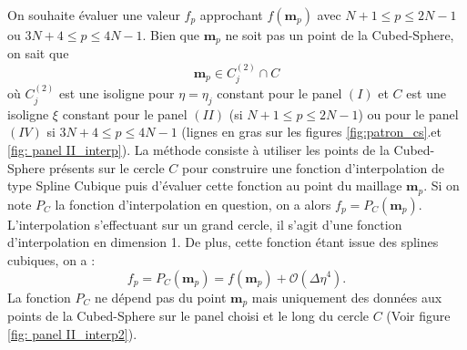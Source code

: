 On souhaite évaluer une valeur $f_p$ approchant $f(\mathbf{m}_p)$ avec $N+1 \leq p \leq 2N-1$ ou $3N+4 \leq p \leq 4N-1$. Bien que $\mathbf{m}_p$ ne soit pas un point de la Cubed-Sphere, on sait que 
\begin{equation}
\mathbf{m}_p \in C^{(2)}_j \cap C
\end{equation} 
où $C^{(2)}_j$ est une isoligne pour $\eta = \eta_j$ constant pour le panel $(I)$ et $C$ est une isoligne $\xi$ constant pour le panel $(II)$ (si $N+1 \leq p \leq 2N-1$) ou pour le panel $(IV)$ si $3N+4 \leq p \leq 4N-1$ (lignes en gras sur les figures \ref{fig:patron_cs}.et \ref{fig: panel II_interp}).
La méthode consiste à utiliser les points de la Cubed-Sphere présents sur le cercle $C$ pour construire une fonction d'interpolation de type Spline Cubique puis d'évaluer cette fonction au point du maillage $\mathbf{m}_p$. Si on note $P_C$ la fonction d'interpolation en question, on a alors $f_p = P_C (\mathbf{m}_p)$. L'interpolation s'effectuant sur un grand cercle, il s'agit d'une fonction d'interpolation en dimension 1. De plus, cette fonction étant issue des splines cubiques, on a :
\begin{equation}
f_p = P_C(\mathbf{m}_p) = f(\mathbf{m}_p) + \mathcal{O}(\Delta \eta^4).
\end{equation}
La fonction $P_C$ ne dépend pas du point $\mathbf{m}_p$ mais uniquement des données aux points de la Cubed-Sphere sur le panel choisi et le long du cercle $C$ (Voir figure \ref{fig: panel II_interp2}).

